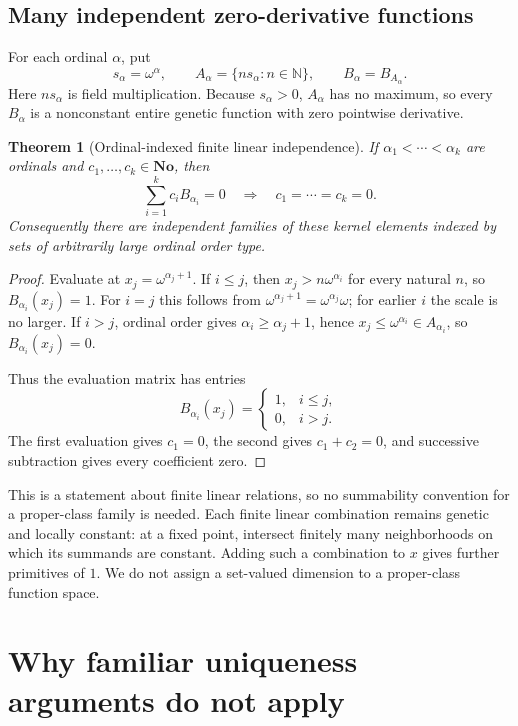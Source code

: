 \documentclass[11pt,letterpaper]{article}
\numberwithin{equation}{section}
\newtheorem{theorem}{Theorem}[section]
\theoremstyle{definition}
\theoremstyle{remark}
\newcommand{\No}{\mathbf{No}}
\newcommand{\N}{\mathbb{N}}
\begin{document}
\subsection{Many independent zero-derivative functions}
For each ordinal $\alpha$, put
\[
 s_\alpha=\omega^\alpha,\qquad
 A_\alpha=\{ns_\alpha:n\in\N\},\qquad B_\alpha=B_{A_\alpha}.
\]
Here $ns_\alpha$ is field multiplication. Because $s_\alpha>0$,
$A_\alpha$ has no maximum, so every $B_\alpha$ is a nonconstant entire
genetic function with zero pointwise derivative.

\begin{theorem}[Ordinal-indexed finite linear independence]\label{thm:independent}
If $\alpha_1<\cdots<\alpha_k$ are ordinals and $c_1,\ldots,c_k\in\No$,
then
\[
 \sum_{i=1}^{k}c_iB_{\alpha_i}=0
 \quad\Longrightarrow\quad c_1=\cdots=c_k=0.
\]
Consequently there are independent families of these kernel elements
indexed by sets of arbitrarily large ordinal order type.
\end{theorem}
\begin{proof}
Evaluate at $x_j=\omega^{\alpha_j+1}$. If $i\le j$, then
$x_j>n\omega^{\alpha_i}$ for every natural $n$, so
$B_{\alpha_i}(x_j)=1$. For $i=j$ this follows from
$\omega^{\alpha_j+1}=\omega^{\alpha_j}\omega$; for earlier $i$ the
scale is no larger. If $i>j$, ordinal order gives
$\alpha_i\ge\alpha_j+1$, hence $x_j\le\omega^{\alpha_i}\in A_{\alpha_i}$,
so $B_{\alpha_i}(x_j)=0$.

Thus the evaluation matrix has entries
\[
 B_{\alpha_i}(x_j)=\begin{cases}1,&i\le j,\\0,&i>j.\end{cases}
\]
The first evaluation gives $c_1=0$, the second gives $c_1+c_2=0$, and
successive subtraction gives every coefficient zero.
\end{proof}

This is a statement about finite linear relations, so no summability
convention for a proper-class family is needed. Each finite linear
combination remains genetic and locally constant: at a fixed point,
intersect finitely many neighborhoods on which its summands are constant.
Adding such a combination to $x$ gives further primitives of $1$.
We do not assign a set-valued dimension to a proper-class function space.

\section{Why familiar uniqueness arguments do not apply}\label{sec:obstruction}
\end{document}
